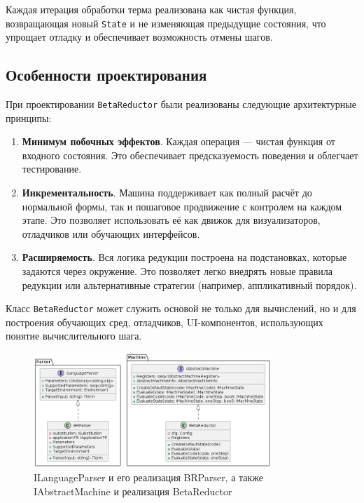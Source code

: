 Каждая итерация обработки терма реализована как чистая функция, возвращающая новый \texttt{State} и не изменяющая предыдущие состояния, что упрощает отладку и обеспечивает возможность отмены шагов.

\subsection{Особенности проектирования}

При проектировании \texttt{BetaReductor} были реализованы следующие архитектурные принципы:

\begin{enumerate}
  \item \textbf{Минимум побочных эффектов}. Каждая операция — чистая функция от входного состояния. Это обеспечивает предсказуемость поведения и облегчает тестирование.
  \item \textbf{Инкрементальность}. Машина поддерживает как полный расчёт до нормальной формы, так и пошаговое продвижение с контролем на каждом этапе. Это позволяет использовать её как движок для визуализаторов, отладчиков или обучающих интерфейсов.
  \item \textbf{Расширяемость}. Вся логика редукции построена на подстановках, которые задаются через окружение. Это позволяет легко внедрять новые правила редукции или альтернативные стратегии (например, аппликативный порядок).
\end{enumerate}


Класс \texttt{BetaReductor} может служить основой не только для вычислений, но и для построения обучающих сред, отладчиков, UI-компонентов, использующих понятие вычислительного шага.

\begin{figure}[h]
  \centering
  \includegraphics[width=0.8\textwidth]{./img/IAbstract.jpg}
  \caption{ILanguageParser и его реализация BRParser, а также IAbstractMachine и реализация BetaReductor}
  \label{fig:IAbstract}
\end{figure}

